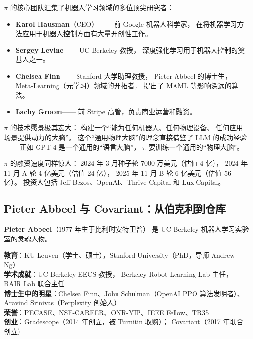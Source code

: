 $\pi$ 的核心团队汇集了机器人学习领域的多位顶尖研究者：

\begin{itemize}[noitemsep]
  \item \textbf{Karol Hausman}（CEO）——
        前 Google 机器人科学家，
        在将机器学习方法应用于机器人控制方面有大量开创性工作。
  \item \textbf{Sergey Levine}——
        UC Berkeley 教授，
        深度强化学习用于机器人控制的奠基人之一。
  \item \textbf{Chelsea Finn}——
        Stanford 大学助理教授，
        Pieter Abbeel 的博士生，
        Meta-Learning（元学习）领域的开拓者，
        提出了 MAML 等影响深远的算法。
  \item \textbf{Lachy Groom}——
        前 Stripe 高管，负责商业运营和融资。
\end{itemize}

$\pi$ 的技术愿景极其宏大：
构建一个``能为任何机器人、任何物理设备、
任何应用场景提供动力的大脑''。
这个``通用物理大脑''的理念直接借鉴了 LLM 的成功经验——
正如 GPT-4 是一个通用的``语言大脑''，
$\pi$ 要训练一个通用的``物理大脑''。

$\pi$ 的融资速度同样惊人：
2024 年 3 月种子轮 7000 万美元（估值 4 亿），
2024 年 11 月 A 轮 4 亿美元（估值 24 亿），
2025 年 11 月 B 轮 6 亿美元（估值 56 亿）。
投资人包括 Jeff Bezos、OpenAI、Thrive Capital 和 Lux Capital。


\subsection{Pieter Abbeel 与 Covariant：从伯克利到仓库}
\label{subsec:pieter-abbeel}

\textbf{Pieter Abbeel}（1977 年生于比利时安特卫普）
是 UC Berkeley 机器人学习实验室的灵魂人物。

\begin{corebox}
\textbf{教育}：KU Leuven（学士、硕士），Stanford University（PhD，导师 Andrew Ng）\\
\textbf{学术成就}：UC Berkeley EECS 教授，
Berkeley Robot Learning Lab 主任，
BAIR Lab 联合主任\\
\textbf{博士生中的明星}：Chelsea Finn、John Schulman（OpenAI PPO 算法发明者）、
Aravind Srinivas（Perplexity 创始人）\\
\textbf{荣誉}：PECASE、NSF-CAREER、ONR-YIP、IEEE Fellow、TR35\\
\textbf{创业}：Gradescope（2014 年创立，被 Turnitin 收购）；
Covariant（2017 年联合创立）
\end{corebox}

